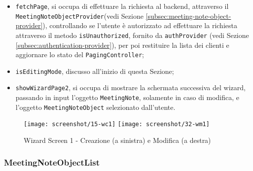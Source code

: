 \begin{itemize}
    \item \lstinline{fetchPage}, si occupa di effettuare la richiesta al \gls{backend}\glsoccur, attraverso il \lstinline{MeetingNoteObjectProvider}(vedi Sezione \ref{subsec:meeting-note-object-provider}), controllando se l'utente è autorizzato ad effettuare la richiesta attraverso il metodo \lstinline{isUnauthorized}, fornito da \lstinline{authProvider} (vedi Sezione \ref{subsec:authentication-provider}), per poi restituire la lista dei clienti e aggiornare lo stato del \lstinline{PagingController};
    \item \lstinline{isEditingMode}, discusso all'inizio di questa Sezione;
    \item \lstinline{showWizardPage2}, si occupa di mostrare la schermata successiva del \gls{wizard}\glsoccur, passando in input l'oggetto \lstinline{MeetingNote}, solamente in caso di modifica, e l'oggetto \lstinline{MeetingNoteObject} selezionato dall'utente.
\end{itemize}

\begin{figure}[!h] 
    \centering 
    \texttt{[image: screenshot/15-wc1]}
    \hfill
    \texttt{[image: screenshot/32-wm1]} 
    \caption{Wizard Screen 1 - Creazione (a sinistra) e Modifica (a destra)}
    \label{fig:w1}
\end{figure}

\subsubsection*{MeetingNoteObjectList}
\label{subsubsec:meeting-note-object-list}

